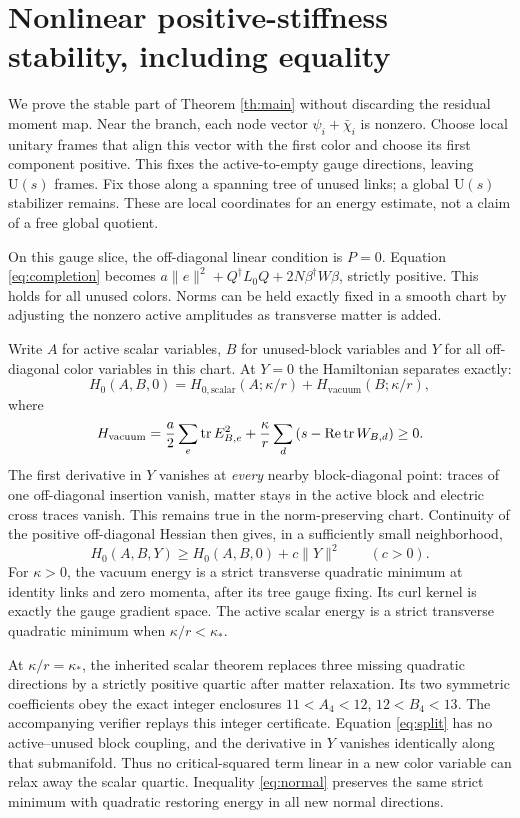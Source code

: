 \documentclass[11pt,a4paper]{article}
\begin{document}
\newpage
\section{Nonlinear positive-stiffness stability, including equality}
We prove the stable part of Theorem \ref{th:main} without discarding the residual moment map. Near the branch, each node vector $\psi_i+\bar\chi_i$ is nonzero. Choose local unitary frames that align this vector with the first color and choose its first component positive. This fixes the active-to-empty gauge directions, leaving $\mathrm U(s)$ frames. Fix those along a spanning tree of unused links; a global $\mathrm U(s)$ stabilizer remains. These are local coordinates for an energy estimate, not a claim of a free global quotient.

On this gauge slice, the off-diagonal linear condition is $P=0$. Equation \eqref{eq:completion} becomes
$a\|e\|^2+Q^\dagger L_0Q+2N\beta^\dagger W\beta$, strictly positive. This holds for all unused colors. Norms can be held exactly fixed in a smooth chart by adjusting the nonzero active amplitudes as transverse matter is added.

Write $A$ for active scalar variables, $B$ for unused-block variables and $Y$ for all off-diagonal color variables in this chart. At $Y=0$ the Hamiltonian separates exactly:
\begin{equation}
H_0(A,B,0)=H_{0,\mathrm{scalar}}(A;\kappa/r)
+H_{\mathrm{vacuum}}(B;\kappa/r),\label{eq:split}
\end{equation}
where
\[
H_{\mathrm{vacuum}}=\frac a2\sum_e\operatorname{tr} E_{B,e}^2
+\frac\kappa r\sum_d\left(s-\operatorname{Re}\operatorname{tr} W_{B,d}\right)\ge0.
\]
The first derivative in $Y$ vanishes at \emph{every} nearby block-diagonal point: traces of one off-diagonal insertion vanish, matter stays in the active block and electric cross traces vanish. This remains true in the norm-preserving chart. Continuity of the positive off-diagonal Hessian then gives, in a sufficiently small neighborhood,
\begin{equation}
H_0(A,B,Y)\ge H_0(A,B,0)+c\|Y\|^2\qquad(c>0).
\label{eq:normal}
\end{equation}
For $\kappa>0$, the vacuum energy is a strict transverse quadratic minimum at identity links and zero momenta, after its tree gauge fixing. Its curl kernel is exactly the gauge gradient space. The active scalar energy is a strict transverse quadratic minimum when $\kappa/r<\kappa_*$.

At $\kappa/r=\kappa_*$, the inherited scalar theorem replaces three missing quadratic directions by a strictly positive quartic after matter relaxation. Its two symmetric coefficients obey the exact integer enclosures $11<A_4<12$, $12<B_4<13$. The accompanying verifier replays this integer certificate. Equation \eqref{eq:split} has no active--unused block coupling, and the derivative in $Y$ vanishes identically along that submanifold. Thus no critical-squared term linear in a new color variable can relax away the scalar quartic. Inequality \eqref{eq:normal} preserves the same strict minimum with quadratic restoring energy in all new normal directions.
\end{document}

